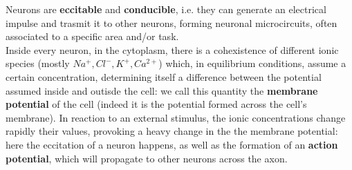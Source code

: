 \documentclass[a4paper]{article}
\begin{document}
	Neurons are \textbf{eccitable} and \textbf{conducible}, i.e. they can generate an electrical impulse and trasmit it to other neurons, forming neuronal microcircuits, often associated to a specific area and/or task. \\
	Inside every neuron, in the cytoplasm, there is a cohexistence of different ionic species (mostly $Na^+, Cl^-, K^+, Ca^{2+}$) which, in equilibrium conditions, assume a certain concentration, determining itself a difference between the potential assumed inside and outisde the cell: we call this quantity the \textbf{membrane potential} of the cell (indeed it is the potential formed across the cell's membrane).  In reaction to an external stimulus, the ionic concentrations change rapidly their values, provoking a heavy change in the the membrane potential: here the eccitation of a neuron happens, as well as the formation of an \textbf{action potential}, which will propagate to other neurons across the axon. 
\end{document}
